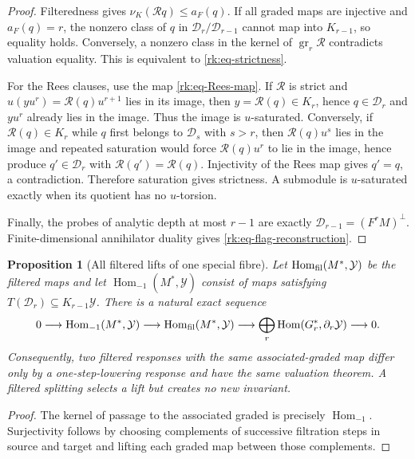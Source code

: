 \documentclass[10pt,reqno]{amsart}
\theoremstyle{plain}
\newtheorem{proposition}[theorem]{Proposition}
\theoremstyle{definition}
\theoremstyle{remark}
\begin{document}
\begin{proof}
Filteredness gives $\nu_K(\mathcal Rq)\le a_F(q)$.  If all graded maps are
injective and $a_F(q)=r$, the nonzero class of $q$ in
$\mathscr D_r/\mathscr D_{r-1}$ cannot map into $K_{r-1}$, so equality
holds.  Conversely, a nonzero class in the kernel of
$\operatorname{gr}_r\mathcal R$ contradicts valuation equality.  This is
equivalent to \eqref{rk:eq-strictness}.

For the Rees clauses, use the map \eqref{rk:eq-Rees-map}.  If
$\mathcal R$ is strict and
$u(yu^r)=\mathcal R(q)u^{r+1}$ lies in its image, then
$y=\mathcal R(q)\in K_r$, hence $q\in\mathscr D_r$ and $yu^r$ already lies
in the image.  Thus the image is $u$-saturated.  Conversely, if
$\mathcal R(q)\in K_r$ while $q$ first belongs to $\mathscr D_s$ with
$s>r$, then $\mathcal R(q)u^s$ lies in the image and repeated saturation
would force $\mathcal R(q)u^r$ to lie in the image, hence produce
$q'\in\mathscr D_r$ with $\mathcal R(q')=\mathcal R(q)$.  Injectivity of the
Rees map gives $q'=q$, a contradiction.  Therefore saturation gives
strictness.  A submodule is $u$-saturated exactly when its quotient has no
$u$-torsion.

Finally, the probes of analytic depth at most $r-1$ are exactly
$\mathscr D_{r-1}=(F^rM)^\perp$.  Finite-dimensional annihilator duality
gives \eqref{rk:eq-flag-reconstruction}.
\end{proof}

\begin{proposition}[All filtered lifts of one special fibre]
\label{rk:prop-filtered-lifts}
Let $\operatorname{Hom}_{\rm fil}(M^*,\mathcal Y)$ be the filtered maps and
let $\operatorname{Hom}_{-1}(M^*,\mathcal Y)$ consist of maps satisfying
$T(\mathscr D_r)\subseteq K_{r-1}\mathcal Y$.  There is a natural exact
sequence
\begin{equation}
 0\longrightarrow\operatorname{Hom}_{-1}(M^*,\mathcal Y)
 \longrightarrow\operatorname{Hom}_{\rm fil}(M^*,\mathcal Y)
 \longrightarrow
 \bigoplus_r\operatorname{Hom}(G_r^*,\partial_r\mathcal Y)
 \longrightarrow0.
 \label{rk:eq-filtered-lift-exact}
\end{equation}
Consequently, two filtered responses with the same associated-graded map
differ only by a one-step-lowering response and have the same valuation
theorem.  A filtered splitting selects a lift but creates no new invariant.
\end{proposition}

\begin{proof}
The kernel of passage to the associated graded is precisely
$\operatorname{Hom}_{-1}$.  Surjectivity follows by choosing complements of
successive filtration steps in source and target and lifting each graded map
between those complements.
\end{proof}
\end{document}
